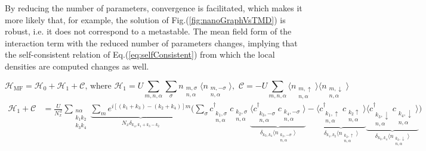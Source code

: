 By reducing the number of parameters, convergence is facilitated, which makes it more likely that, for example, the solution of Fig.(\ref{fig:nanoGraphVsTMD}) is robust, i.e. it  does not correspond to a metastable.
The mean field form of the interaction term with the reduced number of parameters changes, implying that the self-consistent relation of Eq.(\ref{eq:selfConsistent}) from which the local densities are computed changes as well.
\begin{strip}
\vspace{-0.3cm}
\begin{equation}
\mathcal{H}_{\text{MF}} = \mathcal{H}_0 + \mathcal{H}_1 + \mathcal{C} , \,\text{where} \,\, \mathcal{H}_1 = U \sum_{m, n, \alpha}  \sum_\sigma n_{\substack{m, \sigma \\ n, \alpha}} \big\langle n_{\substack{m, -\sigma \\ n, \alpha}} \big\rangle  , \,\, \mathcal{C} = -U  \sum_{m, n, \alpha} \big\langle n_{\substack{m, \uparrow \\ n, \alpha}} \big\rangle \big\langle n_{\substack{m, \downarrow \\ n, \alpha}} \big\rangle
\end{equation}
\begin{equation}
\begin{split}
\mathcal{H}_1 + \mathcal{C} &= \frac{U}{N_x^{\,2}} \sum_{\substack{n \alpha \\ k_1 k_2 \\ k_3 k_4}} \underbrace{\sum_m e^{i [ (k_1 + k_3) - (k_2 + k_4) ] m}}_{N_x \delta_{k_4, k_1 + k_3 - k_2}} \bigg( \sum_\sigma c_{\substack{k_1, \sigma \\ n, \alpha}}^\dagger c_{\substack{k_2, \sigma \\ n, \alpha}} \underbrace{\big\langle c_{\substack{k_3, -\sigma\\ n, \alpha}}^\dagger c_{\substack{k_4, -\sigma \\ n, \alpha}} \big\rangle}_{\delta_{k_3, k_4} \big\langle n_{\substack{k_3,-\sigma \\ n, \alpha}} \big\rangle} - \underbrace{\big\langle c_{\substack{k_1, \uparrow \\ n, \alpha}}^\dagger c_{\substack{k_2  \uparrow \\n, \alpha}} \big\rangle}_{\delta_{k_1, k_2} \big\langle n_{\substack{k_2,\uparrow \\ n, \alpha}} \big\rangle} \underbrace{\big\langle c_{\substack{k_3, \downarrow \\ n, \alpha}}^\dagger c_{\substack{k_4, \downarrow \\ n, \alpha}} \big\rangle}_{\delta_{k_3, k_4} \big\langle n_{\substack{k_3,\downarrow \\ n, \alpha}} \big\rangle}  \bigg) \\

\end{split}
\end{equation}
\end{strip}
